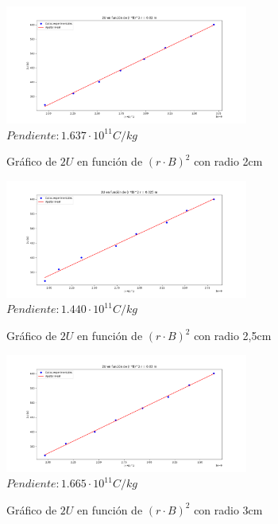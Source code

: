 \documentclass[a4paper]{article}
\begin{document}
    \begin{figure}[h!]
        \centering
        \vspace{-2mm}
        \includegraphics[width = 8cm] {../imagenes/radio2.png}
        \textbf{$Pendiente: 1.637 \cdot 10^{11} C/kg$}
        \caption{Gráfico de $2U$ en función de $(r \cdot B)^2$ con radio 2cm}
        \vspace{-5mm}
    \end{figure}

    \begin{figure}[h!]
        \centering
        \vspace{-2mm}
        \includegraphics[width = 8cm] {../imagenes/radio2,5.png}
        \textbf{$Pendiente: 1.440 \cdot 10^{11} C/kg$}
        \caption{Gráfico de $2U$ en función de $(r \cdot B)^2$ con radio 2,5cm}
        \vspace{-5mm}
    \end{figure}

    \newpage
    \noindent
    \thispagestyle{fancy}

    \begin{figure}[h!]
        \centering
        \vspace{-2mm}
        \includegraphics[width = 8cm] {../imagenes/radio3.png}
        \textbf{$Pendiente: 1.665 \cdot 10^{11} C/kg$}
        \caption{Gráfico de $2U$ en función de $(r \cdot B)^2$ con radio 3cm}
        \vspace{-5mm}
    \end{figure}
\end{document}
